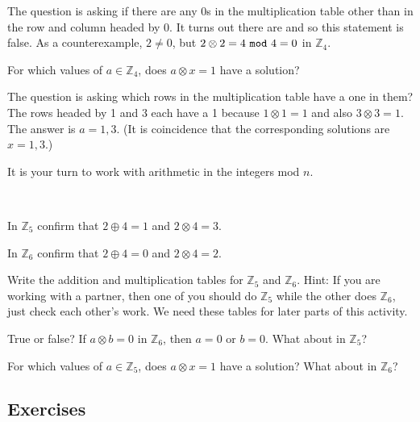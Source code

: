 \begin{exam}
\begin{apart}
\begin{soln}
                The question is asking if there are any 0s in the multiplication table other than in the row and column headed by 0.  It turns out there are and so this statement is false.  As a counterexample, $2 \neq 0$, but $2 \otimes 2 = 4~\texttt{mod}~4= 0$ in $\mathbb{Z}_4$.
            \end{soln}
        \item For which values of $a \in \mathbb{Z}_{4}$, does $a \otimes x = 1$ have a solution? 
            \begin{soln}
                The question is asking which rows in the multiplication table have a one in them?  The rows headed by 1 and 3 each have a 1 because $1 \otimes 1 = 1$ and also $3 \otimes 3 = 1$.  The answer is $a = 1, 3$.  (It is coincidence that the corresponding solutions are $x=1, 3$.)
            \end{soln}
    \end{apart}
\end{exam}

It is your turn to work with arithmetic in the integers mod $n$.

\begin{act}
\label{act_arith_modn}
~
    \begin{actpart}
        \item In $\mathbb{Z}_5$ confirm that $2 \oplus 4 = 1$ and $2 \otimes 4 = 3$.
        \item In $\mathbb{Z}_6$ confirm that $2 \oplus 4 = 0$ and $2 \otimes 4 = 2$.
        \item \label{part_arith_table_mod5_mod6} Write the addition and multiplication tables for $\mathbb{Z}_5$ and $\mathbb{Z}_6$.  Hint: If you are working with a partner, then one of you should do $\mathbb{Z}_5$ while the other does $\mathbb{Z}_6$, just check each other's work.  We need these tables for later parts of this activity.
        \item True or false?  If $a \otimes b = 0$ in $\mathbb{Z}_6$, then $a = 0$ or $b = 0$. What about in $\mathbb{Z}_5$?
        \item For which values of $a \in \mathbb{Z}_{5}$, does $a \otimes x = 1$ have a solution? What about in $\mathbb{Z}_6$?
    \end{actpart}
\end{act}


\subsection{Exercises}

